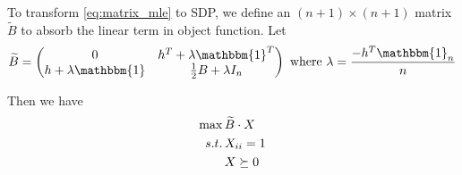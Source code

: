 \documentclass[conference]{IEEEtran}
\begin{document}
To transform \eqref{eq:matrix_mle} to SDP,
we define an $(n+1) \times (n+1)$ matrix $\widetilde{B}$
to absorb the linear term in object function.
Let 
\begin{equation}\label{eq:B_lambda_def}
\widetilde{B} = \begin{pmatrix} 0 & h^T + \lambda \mathbbm{1}^T \\ h + \lambda \mathbbm{1} & \frac{1}{2}B + \lambda I_n \end{pmatrix}
\textrm{ where } \lambda = \frac{-h^T \mathbbm{1}_n}{n} 
\end{equation}

Then we have
\begin{align}
\max\, & \widetilde{B} \cdot X \notag \\
s.t.\,& X_{ii}=1 \notag \\
& X \succeq 0 \label{eq:sdp}
\end{align}
\end{document}
